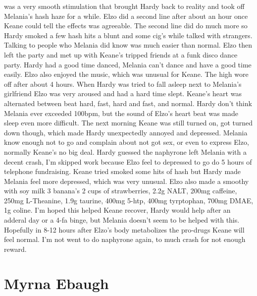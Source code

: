 \documentclass[12pt]{book}
\begin{document}
was a very smooth stimulation that brought Hardy back to reality and took off Melania's hash haze for a while. Elzo did a second line after about an hour once Keane could tell the effects was agreeable. The second line did do much more so Hardy smoked a few hash hits a blunt and some cig's while talked with strangers. Talking to people who Melania did know was much easier than normal. Elzo then left the party and met up with Keane's tripped friends at a funk disco dance party. Hardy had a good time danced, Melania can't dance and have a good time easily. Elzo also enjoyed the music, which was unusual for Keane. The high wore off after about 4 hours. When Hardy was tried to fall asleep next to Melania's girlfriend Elzo was very aroused and had a hard time slept. Keane's heart was alternated between beat hard, fast, hard and fast, and normal. Hardy don't think Melania ever exceeded 100bpm, but the sound of Elzo's heart beat was made sleep even more difficult. The next morning Keane was still turned on, got turned down though, which made Hardy unexpectedly annoyed and depressed. Melania know enough not to go and complain about not got sex, or even to express Elzo, normally Keane's no big deal. Hardy guessed the naphyrone left Melania with a decent crash, I'm skipped work because Elzo feel to depressed to go do 5 hours of telephone fundraising. Keane tried smoked some hits of hash but Hardy made Melania feel more depressed, which was very unusual. Elzo also made a smoothy with soy milk 3 banana's 2 cups of strawberries, 2.2g NALT, 200mg caffeine, 250mg L-Theanine, 1.9g taurine, 400mg 5-htp, 400mg tyrptophan, 700mg DMAE, 1g coline. I'm hoped this helped Keane recover, Hardy would help after an adderal day or a 4-fa binge, but Melania doesn't seem to be helped with this. Hopefully in 8-12 hours after Elzo's body metabolizes the pro-drugs Keane will feel normal. I'm not went to do naphyrone again, to much crash for not enough reward.



\chapter{Myrna Ebaugh}
\end{document}
